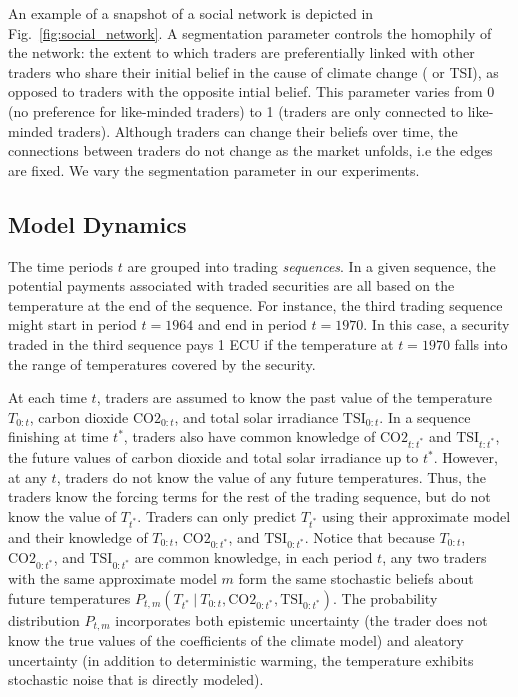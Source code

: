 \documentclass{article}\usepackage[]{graphicx}\usepackage[]{color}
\begin{document}
An example of a snapshot of a social network is depicted in Fig.~\ref{fig:social_network}. 
A segmentation parameter controls the homophily of the network: the extent to which traders are preferentially linked with other traders who share their initial belief in the cause of climate change ( or TSI), as opposed to traders with the opposite intial belief. This parameter varies from 0 (no preference for like-minded traders) to 1 (traders are only connected to like-minded traders).
Although traders can change their beliefs over time, the connections between traders do not change as the market unfolds, i.e the edges are fixed. 
We vary the segmentation parameter in our experiments.

\subsection{Model Dynamics}

The time periods $t$ are grouped into trading \emph{sequences\/}. 
In a given sequence, the potential payments associated with traded securities are all based on the temperature at the end of the sequence. 
For instance, the third trading sequence might start in period $t = 1964$ and end in period $t = 1970$. 
In this case, a security traded in the third sequence pays 1 ECU if the temperature at $t = 1970$ falls into the range of temperatures covered by the security. 

At each time $t$, traders are assumed to know the past value of the temperature ${T}_{0:t}$, carbon dioxide $\text{CO2}_{0:t}$, and total solar irradiance $\text{TSI}_{0:t}$. 
In a sequence finishing at time $t^*$, traders also have common knowledge of $\text{CO2}_{t:t^*}$ and $\text{TSI}_{t:t^*}$, the future values of carbon dioxide and total solar irradiance up to $t^*$.
However, at any $t$, traders do not know the value of any future temperatures. 
Thus, the traders know the forcing terms for the rest of the trading sequence, but do not know the value of ${T}_{t^*}$. 
Traders can only predict ${T}_{t^*}$ using their approximate model and their knowledge of ${T}_{0:t}$, $\text{CO2}_{0:t^*}$, and $\text{TSI}_{0:t^*}$.
Notice that because ${T}_{0:t}$, $\text{CO2}_{0:t^*}$, and $\text{TSI}_{0:t^*}$ are common knowledge, in each period $t$, any two traders with the same approximate model $m$ form the same stochastic beliefs about future temperatures $P_{t,m}({T}_{t^*} ~|~ {T}_{0:t}, \text{CO2}_{0:t^*}, \text{TSI}_{0:t^*})$.
The probability distribution $P_{t,m}$ incorporates both epistemic uncertainty (the trader does not know the true values of the coefficients of the climate model) and aleatory uncertainty (in addition to deterministic warming, the temperature exhibits stochastic noise that is directly modeled).
     
\end{document}
